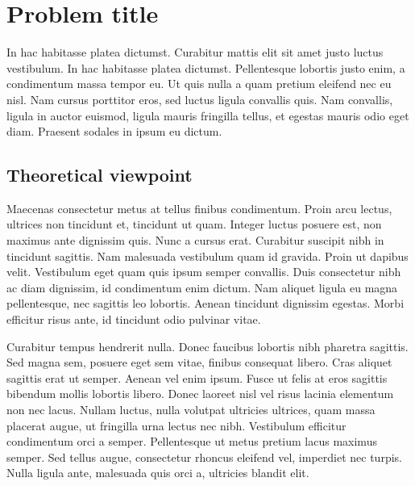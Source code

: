 \documentclass{article}
\begin{document}

\section{Problem title} %

In hac habitasse platea dictumst. Curabitur mattis elit sit amet justo luctus vestibulum. In hac habitasse platea dictumst. Pellentesque lobortis justo enim, a condimentum massa tempor eu. Ut quis nulla a quam pretium eleifend nec eu nisl. Nam cursus porttitor eros, sed luctus ligula convallis quis. Nam convallis, ligula in auctor euismod, ligula mauris fringilla tellus, et egestas mauris odio eget diam. Praesent sodales in ipsum eu dictum.


\subsection{Theoretical viewpoint}

Maecenas consectetur metus at tellus finibus condimentum. Proin arcu lectus, ultrices non tincidunt et, tincidunt ut quam. Integer luctus posuere est, non maximus ante dignissim quis. Nunc a cursus erat. Curabitur suscipit nibh in tincidunt sagittis. Nam malesuada vestibulum quam id gravida. Proin ut dapibus velit. Vestibulum eget quam quis ipsum semper convallis. Duis consectetur nibh ac diam dignissim, id condimentum enim dictum. Nam aliquet ligula eu magna pellentesque, nec sagittis leo lobortis. Aenean tincidunt dignissim egestas. Morbi efficitur risus ante, id tincidunt odio pulvinar vitae.

Curabitur tempus hendrerit nulla. Donec faucibus lobortis nibh pharetra sagittis. Sed magna sem, posuere eget sem vitae, finibus consequat libero. Cras aliquet sagittis erat ut semper. Aenean vel enim ipsum. Fusce ut felis at eros sagittis bibendum mollis lobortis libero. Donec laoreet nisl vel risus lacinia elementum non nec lacus. Nullam luctus, nulla volutpat ultricies ultrices, quam massa placerat augue, ut fringilla urna lectus nec nibh. Vestibulum efficitur condimentum orci a semper. Pellentesque ut metus pretium lacus maximus semper. Sed tellus augue, consectetur rhoncus eleifend vel, imperdiet nec turpis. Nulla ligula ante, malesuada quis orci a, ultricies blandit elit.
\end{document}
